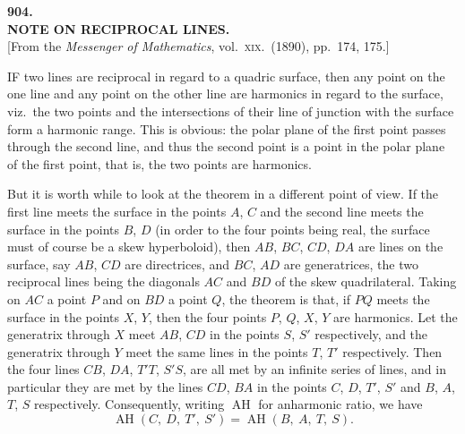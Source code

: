 \documentclass[11pt,a4paper]{article}
\providecommand{\AH}{\operatorname{AH}}
\begin{document}
\clearpage

\begin{center}
{\large\bfseries 904.}\\[0.5em]
{\large\bfseries NOTE ON RECIPROCAL LINES.}\\[0.5em]
\small [From the \emph{Messenger of Mathematics}, vol.\ \textsc{xix}.\ (1890), pp.\ 174, 175.]
\end{center}
\medskip

\noindent IF two lines are reciprocal in regard to a quadric surface, then any point on the one line and any point on the other line are harmonics in regard to the surface, viz.\ the two points and the intersections of their line of junction with the surface form a harmonic range. This is obvious: the polar plane of the first point passes through the second line, and thus the second point is a point in the polar plane of the first point, that is, the two points are harmonics.

But it is worth while to look at the theorem in a different point of view. If the first line meets the surface in the points $A$, $C$ and the second line meets the surface in the points $B$, $D$ (in order to the four points being real, the surface must of course be a skew hyperboloid), then $AB$, $BC$, $CD$, $DA$ are lines on the surface, say $AB$, $CD$ are directrices, and $BC$, $AD$ are generatrices, the two reciprocal lines being the diagonals $AC$ and $BD$ of the skew quadrilateral. Taking on $AC$ a point $P$ and on $BD$ a point $Q$, the theorem is that, if $PQ$ meets the surface in the points $X$, $Y$, then the four points $P$, $Q$, $X$, $Y$ are harmonics. Let the generatrix through $X$ meet $AB$, $CD$ in the points $S$, $S'$ respectively, and the generatrix through $Y$ meet the same lines in the points $T$, $T'$ respectively. Then the four lines $CB$, $DA$, $T'T$, $S'S$, are all met by an infinite series of lines, and in particular they are met by the lines $CD$, $BA$ in the points $C$, $D$, $T'$, $S'$ and $B$, $A$, $T$, $S$ respectively. Consequently, writing $\AH$ for anharmonic ratio, we have
\[
\AH(C,\ D,\ T',\ S') = \AH(B,\ A,\ T,\ S).
\]
\end{document}
